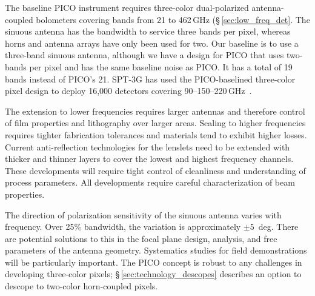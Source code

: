 The baseline PICO instrument requires three-color dual-polarized antenna-coupled bolometers covering bands from 21 to 462\,GHz 
(\S\,\ref{sec:low_freq_det}.  The sinuous antenna has the bandwidth to service three bands per pixel, whereas horns and antenna arrays have only been used for two. Our baseline is to use a three-band sinuous antenna, although we have a design for PICO that uses two-bands per pixel and has the same baseline noise as PICO. It has a total of 19 bands instead of PICO's 21. SPT-3G has used the PICO-baselined three-color pixel design to deploy 16,000 detectors covering 90--150--220\,GHz~\citep{Dutcher2018}.

The extension to lower frequencies requires larger antennas and therefore control of film properties and lithography over larger areas. Scaling to higher frequencies requires tighter fabrication tolerances and materials tend to exhibit higher losses. Current anti-reflection technologies for the lenslets need to be extended with thicker and thinner layers to cover the lowest and highest frequency channels. These developments will require tight control of cleanliness and understanding of process parameters. All developments require careful characterization of beam properties.

The direction of polarization sensitivity of the sinuous antenna varies with frequency. Over 25\% bandwidth, the variation is approximately $\pm 5$~deg.  There are potential solutions to this in the focal plane design, analysis, and free parameters of the antenna geometry.  Systematics studies for field demonstrations will be particularly important. The PICO concept is robust to any challenges in developing three-color pixels; \S\,\ref{sec:technology_descopes} describes an option to descope to two-color horn-coupled pixels.


